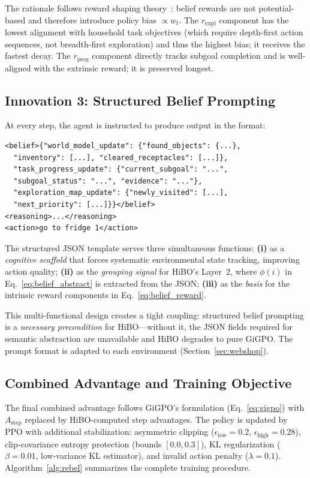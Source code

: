 \documentclass{article}
\begin{document}
The rationale follows reward shaping theory~\citep{ng1999policy}: belief
rewards are not potential-based and therefore introduce policy bias
$\propto w_t$.
The $r_{\text{expl}}$ component has the lowest alignment with household task
objectives (which require depth-first action sequences, not breadth-first
exploration) and thus the highest bias; it receives the fastest decay.
The $r_{\text{prog}}$ component directly tracks subgoal completion and is
well-aligned with the extrinsic reward; it is preserved longest.


\subsection{Innovation 3: Structured Belief Prompting}
\label{sec:belief_prompt}

At every step, the agent is instructed to produce output in the format:
\begin{small}
\begin{verbatim}
<belief>{"world_model_update": {"found_objects": {...},
  "inventory": [...], "cleared_receptacles": [...]},
  "task_progress_update": {"current_subgoal": "...",
  "subgoal_status": "...", "evidence": "..."},
  "exploration_map_update": {"newly_visited": [...],
  "next_priority": [...]}}</belief>
<reasoning>...</reasoning>
<action>go to fridge 1</action>
\end{verbatim}
\end{small}
The structured JSON template serves three simultaneous functions:
\textbf{(i)} as a \emph{cognitive scaffold} that forces systematic environmental
state tracking, improving action quality;
\textbf{(ii)} as the \emph{grouping signal} for HiBO's Layer~2, where
$\phi(i)$ in Eq.~\eqref{eq:belief_abstract} is extracted from the JSON;
\textbf{(iii)} as the \emph{basis} for the intrinsic reward components
in Eq.~\eqref{eq:belief_reward}.

This multi-functional design creates a tight coupling: structured belief
prompting is a \emph{necessary precondition} for HiBO---without it, the
JSON fields required for semantic abstraction are unavailable and HiBO
degrades to pure GiGPO.
The prompt format is adapted to each environment (Section~\ref{sec:webshop}).

\subsection{Combined Advantage and Training Objective}

The final combined advantage follows GiGPO's formulation (Eq.~\eqref{eq:gigpo})
with $A_{\text{step}}$ replaced by HiBO-computed step advantages.
The policy is updated by PPO with additional stabilization:
asymmetric clipping ($\epsilon_{\text{low}}=0.2$, $\epsilon_{\text{high}}=0.28$),
clip-covariance entropy protection (bounds $[0.0, 0.3]$), KL regularization
($\beta = 0.01$, low-variance KL estimator), and invalid action penalty
($\lambda = 0.1$).
Algorithm~\ref{alg:rebel} summarizes the complete training procedure.
\end{document}
